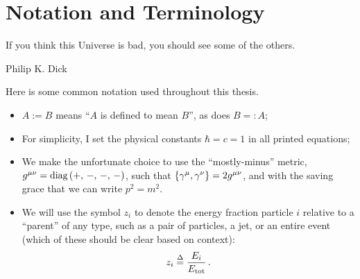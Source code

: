 \section*{Notation and Terminology}


\epigraph{If you think this Universe is bad, you should see some of the others.}{Philip K. Dick}

Here is some common notation used throughout this thesis.
\begin{itemize}
    \item
        \(A := B\) means ``\(A\) is defined to mean \(B\)'', as does \(B =: A\);

    \item
        For simplicity, I set the physical constants \(\hbar = c = 1\) in all printed equations;

    \item
        We make the unfortunate choice to use the ``mostly-minus'' metric, \(g^{\mu\nu} = \text{diag}\left(+,\,-,\,-,\,-\right)\), such that \(\acomm{\gamma^\mu}{\gamma^\nu} = 2 g^{\mu\nu}\), and with the saving grace that we can write \(p^2 = m^2\).

    \item
        We will use the symbol \(z_i\) to denote the energy fraction particle \(i\) relative to a ``parent'' of any type, such as a pair of particles, a jet, or an entire event (which of these should be clear based on context):
        \begin{align}
            z_i
            \overset{\Delta}{=}
            \frac{E_i}{E_\text{tot}}
            \,.
        \end{align}



\end{itemize}
